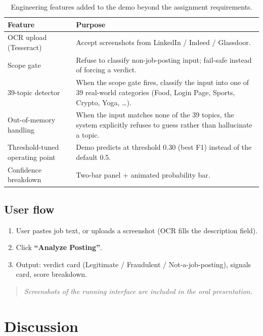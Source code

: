 \documentclass[11pt,a4paper]{article}
\begin{document}
\begin{table}[H]
\centering
\caption{Engineering features added to the demo beyond the assignment
requirements.}
\renewcommand{\arraystretch}{1.2}
\begin{tabularx}{\linewidth}{l X}
\toprule
\textbf{Feature} & \textbf{Purpose} \\
\midrule
OCR upload (Tesseract) & Accept screenshots from LinkedIn / Indeed / Glassdoor. \\
Scope gate            & Refuse to classify non-job-posting input; fail-safe instead of forcing a verdict. \\
39-topic detector     & When the scope gate fires, classify the input into one of 39 real-world categories (Food, Login Page, Sports, Crypto, Yoga, \dots). \\
Out-of-memory handling & When the input matches none of the 39 topics, the system explicitly refuses to guess rather than hallucinate a topic. \\
Threshold-tuned operating point & Demo predicts at threshold 0.30 (best F1) instead of the default 0.5. \\
Confidence breakdown  & Two-bar panel + animated probability bar. \\
\bottomrule
\end{tabularx}
\end{table}

\subsection{User flow}

\begin{enumerate}
    \item User pastes job text, or uploads a screenshot (OCR fills the
          description field).
    \item Click \textbf{``Analyze Posting''}.
    \item Output: verdict card (Legitimate / Fraudulent / Not-a-job-posting),
          signals card, score breakdown.
\end{enumerate}

\begin{quote}\small\itshape
Screenshots of the running interface are included in the oral
presentation.
\end{quote}

\section{Discussion}
\end{document}
